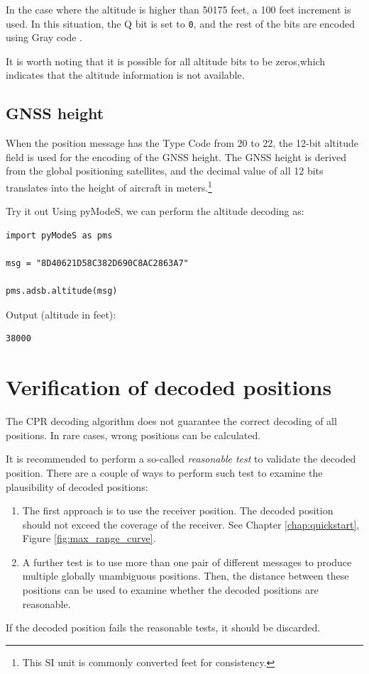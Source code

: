 In the case where the altitude is higher than 50175 feet, a 100 feet increment is used. In this situation, the Q bit is set to \texttt{0}, and the rest of the bits are encoded using Gray code \cite{doran2007}. 

It is worth noting that it is possible for all altitude bits to be zeros,which indicates that the altitude information is not available.


\subsection{GNSS height}

When the position message has the Type Code from 20 to 22, the 12-bit altitude field is used for the encoding of the GNSS height. The GNSS height is derived from the global positioning satellites, and the decimal value of all 12 bits translates into the height of aircraft in meters.\footnote{This SI unit is commonly converted feet for consistency.}

\begin{notebox}{Try it out}
Using pyModeS, we can perform the altitude decoding as: 

\begin{verbatim}
import pyModeS as pms

msg = "8D40621D58C382D690C8AC2863A7"

pms.adsb.altitude(msg)
\end{verbatim}

Output (altitude in feet): 

\begin{verbatim}
38000
\end{verbatim}
\end{notebox}



\section{Verification of decoded positions}

The CPR decoding algorithm does not guarantee the correct decoding of all positions. In rare cases, wrong positions can be calculated. 

It is recommended to perform a so-called \emph{reasonable test} to validate the decoded position. There are a couple of ways to perform such test to examine the plausibility of decoded positions:

\begin{enumerate}
  \item The first approach is to use the receiver position. The decoded position should not exceed the coverage of the receiver. See Chapter \ref{chap:quickstart}, Figure \ref{fig:max_range_curve}.

  \item A further test is to use more than one pair of different messages to produce multiple globally unambiguous positions. Then, the distance between these positions can be used to examine whether the decoded positions are reasonable.
\end{enumerate}

If the decoded position fails the reasonable tests, it should be discarded.
